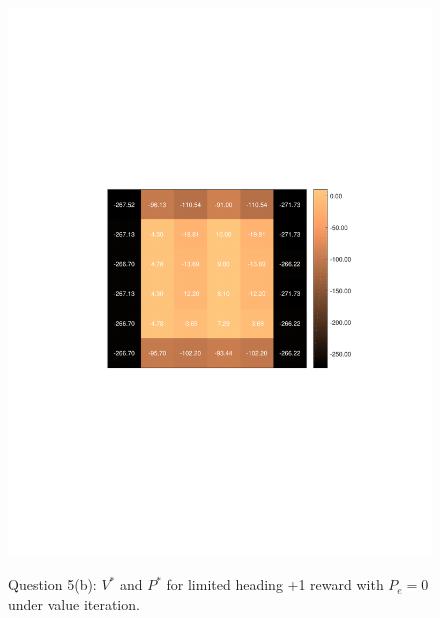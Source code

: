 \documentclass{article}
\begin{document}
\begin{figure}[h!]
\begin{minipage}{0.4\textwidth}
{				\includegraphics[trim={5cm 9cm 3cm 9cm},clip,scale = 0.7]{plots/Probabilistic/5bPe01.pdf}
				\label{fig:subfig2}} 
		\end{minipage}
		
		\caption{Question 5(b): $V^*$ and $P^*$ for limited heading +1 reward with $P_{e} = 0$ under value iteration.}
		\label{fig:globfig}
	\end{figure}
\end{document}
